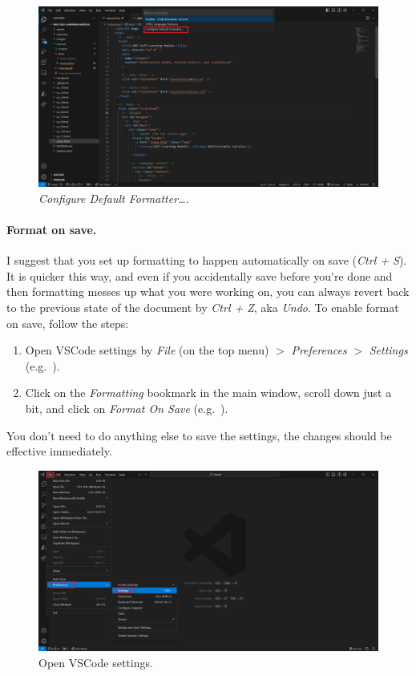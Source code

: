 \documentclass[a4paper,10pt]{article}
\begin{document}
\begin{figure}[htbp]
    \centering
    \includegraphics[width=\textwidth]{configure_formatter.png}
    \caption{\emph{Configure Default Formatter\dots}.}
    \label{fig:configure_formatter}   
\end{figure}

\paragraph{Format on save.} I suggest that you set up formatting to happen automatically on save (\emph{Ctrl + S}). It is quicker this way, and even if you accidentally save before you're done and then formatting messes up what you were working on, you can always revert back to the previous state of the document by \emph{Ctrl + Z}, aka \emph{Undo}. To enable format on save, follow the steps:
\begin{enumerate}
    \item Open VSCode settings by \emph{File} (on the top menu) $>$ \emph{Preferences} $>$ \emph{Settings} (e.g.\ ).
    \item Click on the \emph{Formatting} bookmark in the main window, scroll down just a bit, and click on \emph{Format On Save} (e.g.\ ).
\end{enumerate}
You don't need to do anything else to save the settings, the changes should be effective immediately.

\begin{figure}[htbp]
    \centering
    \includegraphics[width=\textwidth]{vscode_settings.png}
    \caption{Open VSCode settings.}
    \label{fig:vscode_settings}   
\end{figure}
\end{document}
